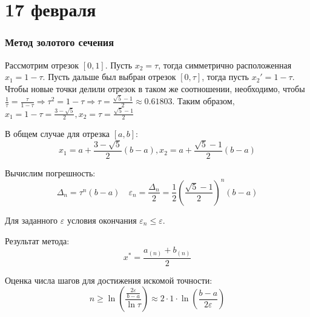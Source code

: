 \chapter{17 февраля}

\subsection{Метод золотого сечения}

Рассмотрим отрезок \([0, 1]\). Пусть \(x_2 = \tau\), тогда симметрично расположенная \(x_1 = 1 - \tau\). Пусть дальше был выбран отрезок \([0, \tau]\), тогда пусть \(x_2' = 1 - \tau\). Чтобы новые точки делили отрезок в таком же соотношении, необходимо, чтобы \(\frac{1}{\tau} = \frac{\tau}{1 - \tau} \Rightarrow \tau^2 = 1 - \tau \Rightarrow \tau = \frac{\sqrt{5} - 1}{2} \approx 0.61803\). Таким образом, \(x_1 = 1 - \tau = \frac{3 - \sqrt{5}}{2}, x_2 = \tau = \frac{\sqrt{5} - 1}{2}\)

В общем случае для отрезка \([a, b]\):
\begin{equation}
    x_1 = a + \frac{3 - \sqrt{5}}{2}(b - a), x_2 = a + \frac{\sqrt{5} - 1}{2} (b - a) \label{x_1, x_2, метод золотого сечения}
\end{equation}

Вычислим погрешность:
\[\Delta_n = \tau^n (b - a) \quad \varepsilon_n = \frac{\Delta_n}{2} = \frac{1}{2}\left( \frac{\sqrt{5} - 1}{2} \right)^n (b - a)\]

Для заданного \(\varepsilon\) условия окончания \(\varepsilon_n \leq \varepsilon\).

Результат метода:
\[x^* = \frac{a_{(n)} + b_{(n)}}{2}\]

Оценка числа шагов для достижения искомой точности:
\[n \geq \ln\left( \frac{\frac{2\varepsilon}{b - a}}{\ln \tau} \right) \approx 2 \cdot 1 \cdot \ln\left( \frac{b - a}{2\varepsilon} \right)\]

